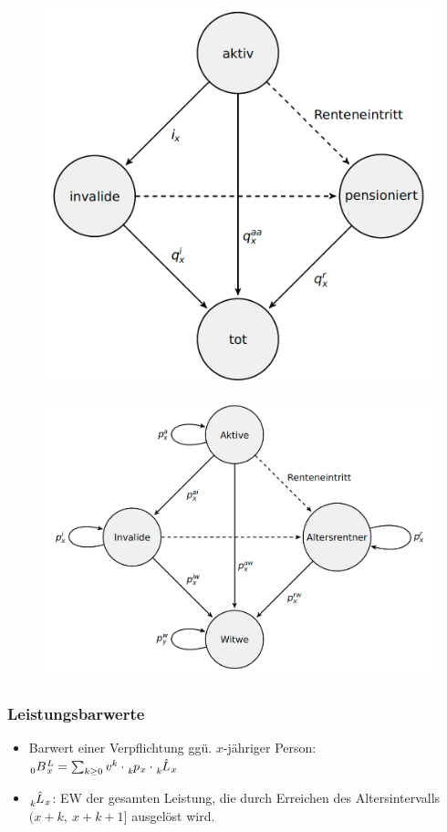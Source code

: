 \documentclass[12pt]{report}
\theoremstyle{dotless}
\theoremstyle{definition}
\begin{document}
\begin{figure}[ht]
	\centering
	\includegraphics[width=.75\textwidth]{Bilder/Bevoelkerungsmodell.png}
\end{figure}

\begin{figure}[ht]
	\centering
	\includegraphics[width=.75\textwidth]{Bilder/Bevoelkerungsmodell2.png}
\end{figure}


\subsubsection{Leistungsbarwerte}

\begin{itemize}
	\item Barwert einer Verpflichtung ggü. $x$-jähriger Person: $\tensor[_{0}]{B}{}_x^L=\sum_{k\geq 0}v^k \cdot \tensor[_{k}]{p}{}_x \cdot \tensor[_{k}]{\hat{L}}{}_x$
	\item $\tensor[_{k}]{\hat{L}}{}_x$: EW der gesamten Leistung, die durch Erreichen des Altersintervalls $(x+k, \ x+k+1]$ ausgelöst wird.
\end{itemize}
\end{document}

